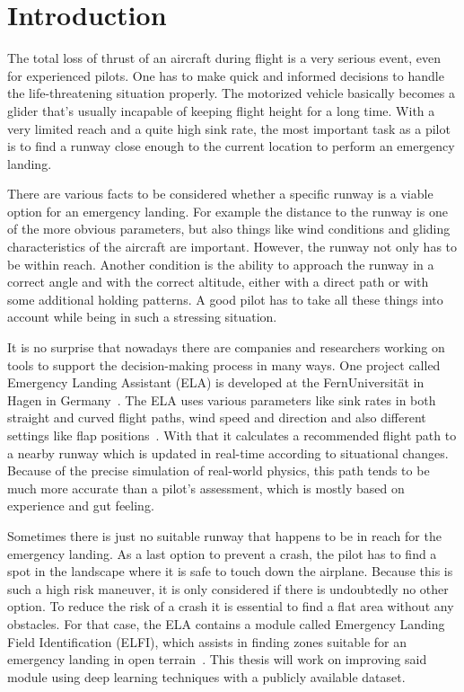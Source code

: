 \section{Introduction}
The total loss of thrust of an aircraft during flight is a very serious event, even for experienced pilots. One has to make quick and informed decisions to handle the life-threatening situation properly. The motorized vehicle basically becomes a glider that's usually incapable of keeping flight height for a long time. With a very limited reach and a quite high sink rate, the most important task as a pilot is to find a runway close enough to the current location to perform an emergency landing.

There are various facts to be considered whether a specific runway is a viable option for an emergency landing. For example the distance to the runway is one of the more obvious parameters, but also things like wind conditions and gliding characteristics of the aircraft are important. However, the runway not only has to be within reach. Another condition is the ability to approach the runway in a correct angle and with the correct altitude, either with a direct path or with some additional holding patterns. A good pilot has to take all these things into account while being in such a stressing situation.

It is no surprise that nowadays there are companies and researchers working on tools to support the decision-making process in many ways. One project called Emergency Landing Assistant (ELA) is developed at the FernUniversität in Hagen in Germany~\cite{feu_fas}. The ELA uses various parameters like sink rates in both straight and curved flight paths, wind speed and direction and also different settings like flap positions~\cite{glide_path20}. With that it calculates a recommended flight path to a nearby runway which is updated in real-time according to situational changes. Because of the precise simulation of real-world physics, this path tends to be much more accurate than a pilot's assessment, which is mostly based on experience and gut feeling.

Sometimes there is just no suitable runway that happens to be in reach for the emergency landing. As a last option to prevent a crash, the pilot has to find a spot in the landscape where it is safe to touch down the airplane. Because this is such a high risk maneuver, it is only considered if there is undoubtedly no other option. To reduce the risk of a crash it is essential to find a flat area without any obstacles. For that case, the ELA contains a module called Emergency Landing Field Identification (ELFI), which assists in finding zones suitable for an emergency landing in open terrain~\cite{feu_elfi}. This thesis will work on improving said module using deep learning techniques with a publicly available dataset.

